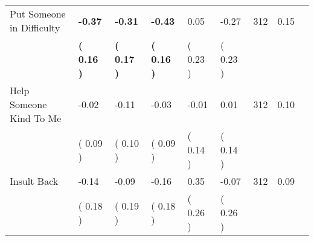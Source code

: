 \begin{tabular}{L{6.2cm} C{1.8cm} C{1.8cm} C{1.8cm} C{1.8cm} C{1.8cm} C{1.8cm} C{0.3cm} C{0.3cm}}
Put Someone in Difficulty & \textbf{    -0.37} & \textbf{    -0.31} & \textbf{    -0.43} &      0.05 &     -0.27  & 312 &       0.15 \\ 
 & \textbf{(     0.16 )} & \textbf{(     0.17 )} & \textbf{(     0.16 )} & (     0.23 ) & (     0.23 )  & \\
Help Someone Kind To Me &     -0.02 &     -0.11 &     -0.03 &     -0.01 &      0.01  & 312 &       0.10 \\ 
 & (     0.09 ) & (     0.10 ) & (     0.09 ) & (     0.14 ) & (     0.14 )  & \\
Insult Back &     -0.14 &     -0.09 &     -0.16 &      0.35 &     -0.07  & 312 &       0.09 \\ 
 & (     0.18 ) & (     0.19 ) & (     0.18 ) & (     0.26 ) & (     0.26 )  & \\
\bottomrule
\end{tabular}
